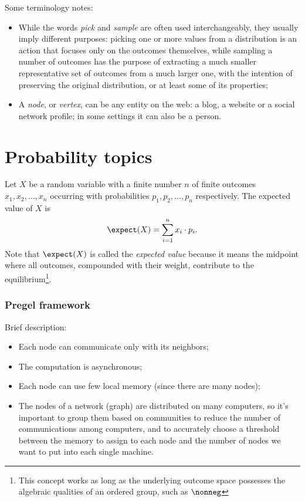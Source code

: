 Some terminology notes:

\begin{itemize}
    \item While the words \emph{pick} and \emph{sample} are often used interchangeably, they usually imply different purposes: picking one or more values from a distribution is an action that focuses only on the outcomes themselves, while sampling a number of outcomes has the purpose of extracting a much smaller representative set of outcomes from a much larger one, with the intention of preserving the original distribution, or at least some of its properties;
    \item A \emph{node}, or \emph{vertex}, can be any entity on the web: a blog, a website or a social network profile; in some settings it can also be a person.
\end{itemize}


\section{Probability topics}
    
\begin{definition}\label{def:expected-value}
    Let $X$ be a random variable with a finite number $n$ of finite outcomes $x_1, x_2, \ldots, x_n$ occurring with probabilities $p_1, p_2, \ldots, p_n$ respectively. The expected value of $X$ is
    \begin{equation}
        \expect(X) = \sum_{i = 1}^{n} x_i \cdot p_i.
    \end{equation}
    Note that $\expect(X)$ is called the \textit{expected value} because it means the midpoint where all outcomes, compounded with their weight, contribute to the equilibrium\footnote{This concept works as long as the underlying outcome space possesses the algebraic qualities of an ordered group, such as $\nonneg$}.
\end{definition}


\subsubsection{Pregel framework}

Brief description:
\begin{itemize}
    \item Each node can communicate only with its neighbors;
    \item The computation is asynchronous;
    \item Each node can use few local memory (since there are many nodes);
    \item The nodes of a network (graph) are distributed on many computers, so it's important to group them based on communities to reduce the number of communications among computers, and to accurately choose a threshold between the memory to assign to each node and the number of nodes we want to put into each single machine.
\end{itemize}


